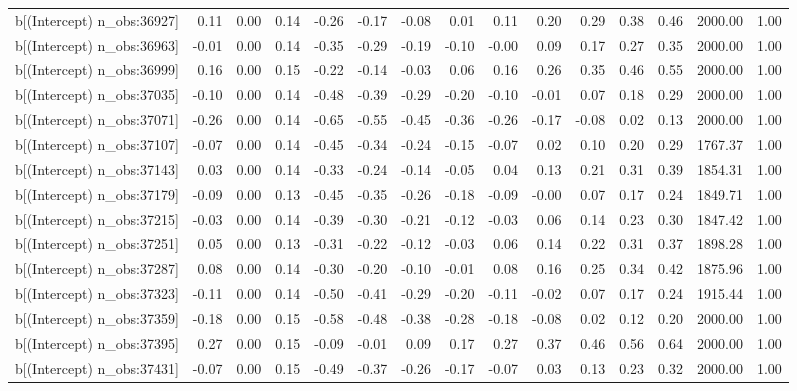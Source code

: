 \begin{table}[ht]
\begin{tabular}{rrrrrrrrrrrrrrr}
  b[(Intercept) n\_obs:36927] & 0.11 & 0.00 & 0.14 & -0.26 & -0.17 & -0.08 & 0.01 & 0.11 & 0.20 & 0.29 & 0.38 & 0.46 & 2000.00 & 1.00 \\ 
  b[(Intercept) n\_obs:36963] & -0.01 & 0.00 & 0.14 & -0.35 & -0.29 & -0.19 & -0.10 & -0.00 & 0.09 & 0.17 & 0.27 & 0.35 & 2000.00 & 1.00 \\ 
  b[(Intercept) n\_obs:36999] & 0.16 & 0.00 & 0.15 & -0.22 & -0.14 & -0.03 & 0.06 & 0.16 & 0.26 & 0.35 & 0.46 & 0.55 & 2000.00 & 1.00 \\ 
  b[(Intercept) n\_obs:37035] & -0.10 & 0.00 & 0.14 & -0.48 & -0.39 & -0.29 & -0.20 & -0.10 & -0.01 & 0.07 & 0.18 & 0.29 & 2000.00 & 1.00 \\ 
  b[(Intercept) n\_obs:37071] & -0.26 & 0.00 & 0.14 & -0.65 & -0.55 & -0.45 & -0.36 & -0.26 & -0.17 & -0.08 & 0.02 & 0.13 & 2000.00 & 1.00 \\ 
  b[(Intercept) n\_obs:37107] & -0.07 & 0.00 & 0.14 & -0.45 & -0.34 & -0.24 & -0.15 & -0.07 & 0.02 & 0.10 & 0.20 & 0.29 & 1767.37 & 1.00 \\ 
  b[(Intercept) n\_obs:37143] & 0.03 & 0.00 & 0.14 & -0.33 & -0.24 & -0.14 & -0.05 & 0.04 & 0.13 & 0.21 & 0.31 & 0.39 & 1854.31 & 1.00 \\ 
  b[(Intercept) n\_obs:37179] & -0.09 & 0.00 & 0.13 & -0.45 & -0.35 & -0.26 & -0.18 & -0.09 & -0.00 & 0.07 & 0.17 & 0.24 & 1849.71 & 1.00 \\ 
  b[(Intercept) n\_obs:37215] & -0.03 & 0.00 & 0.14 & -0.39 & -0.30 & -0.21 & -0.12 & -0.03 & 0.06 & 0.14 & 0.23 & 0.30 & 1847.42 & 1.00 \\ 
  b[(Intercept) n\_obs:37251] & 0.05 & 0.00 & 0.13 & -0.31 & -0.22 & -0.12 & -0.03 & 0.06 & 0.14 & 0.22 & 0.31 & 0.37 & 1898.28 & 1.00 \\ 
  b[(Intercept) n\_obs:37287] & 0.08 & 0.00 & 0.14 & -0.30 & -0.20 & -0.10 & -0.01 & 0.08 & 0.16 & 0.25 & 0.34 & 0.42 & 1875.96 & 1.00 \\ 
  b[(Intercept) n\_obs:37323] & -0.11 & 0.00 & 0.14 & -0.50 & -0.41 & -0.29 & -0.20 & -0.11 & -0.02 & 0.07 & 0.17 & 0.24 & 1915.44 & 1.00 \\ 
  b[(Intercept) n\_obs:37359] & -0.18 & 0.00 & 0.15 & -0.58 & -0.48 & -0.38 & -0.28 & -0.18 & -0.08 & 0.02 & 0.12 & 0.20 & 2000.00 & 1.00 \\ 
  b[(Intercept) n\_obs:37395] & 0.27 & 0.00 & 0.15 & -0.09 & -0.01 & 0.09 & 0.17 & 0.27 & 0.37 & 0.46 & 0.56 & 0.64 & 2000.00 & 1.00 \\ 
  b[(Intercept) n\_obs:37431] & -0.07 & 0.00 & 0.15 & -0.49 & -0.37 & -0.26 & -0.17 & -0.07 & 0.03 & 0.13 & 0.23 & 0.32 & 2000.00 & 1.00 \\ 

\end{tabular}
\end{table}
